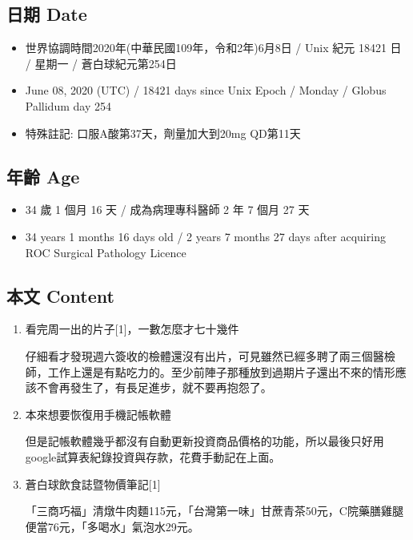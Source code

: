 \documentclass[
]{article}
\providecommand{\tightlist}{%
  \setlength{\itemsep}{0pt}\setlength{\parskip}{0pt}}
\begin{document}
\hypertarget{ux65e5ux671f-date-7}{%
\subsection{日期 Date}\label{ux65e5ux671f-date-7}}

\begin{itemize}
\tightlist
\item
  世界協調時間2020年(中華民國109年，令和2年)6月8日 / Unix 紀元 18421 日
  / 星期一 / 蒼白球紀元第254日
\item
  June 08, 2020 (UTC) / 18421 days since Unix Epoch / Monday / Globus
  Pallidum day 254
\item
  特殊註記: 口服A酸第37天，劑量加大到20mg QD第11天
\end{itemize}

\hypertarget{ux5e74ux9f61-age-7}{%
\subsection{年齡 Age}\label{ux5e74ux9f61-age-7}}

\begin{itemize}
\tightlist
\item
  34 歲 1 個月 16 天 / 成為病理專科醫師 2 年 7 個月 27 天
\item
  34 years 1 months 16 days old / 2 years 7 months 27 days after
  acquiring ROC Surgical Pathology Licence
\end{itemize}

\hypertarget{ux672cux6587-content-7}{%
\subsection{本文 Content}\label{ux672cux6587-content-7}}

\begin{enumerate}
\def\labelenumi{\arabic{enumi}.}
\item
  看完周一出的片子{[}1{]}，一數怎麼才七十幾件

  仔細看才發現週六簽收的檢體還沒有出片，可見雖然已經多聘了兩三個醫檢師，工作上還是有點吃力的。至少前陣子那種放到過期片子還出不來的情形應該不會再發生了，有長足進步，就不要再抱怨了。
\item
  本來想要恢復用手機記帳軟體

  但是記帳軟體幾乎都沒有自動更新投資商品價格的功能，所以最後只好用google試算表紀錄投資與存款，花費手動記在上面。
\item
  蒼白球飲食誌暨物價筆記{[}1{]}

  「三商巧福」清燉牛肉麵115元，「台灣第一味」甘蔗青茶50元，C院藥膳雞腿便當76元，「多喝水」氣泡水29元。
\end{enumerate}
\end{document}
